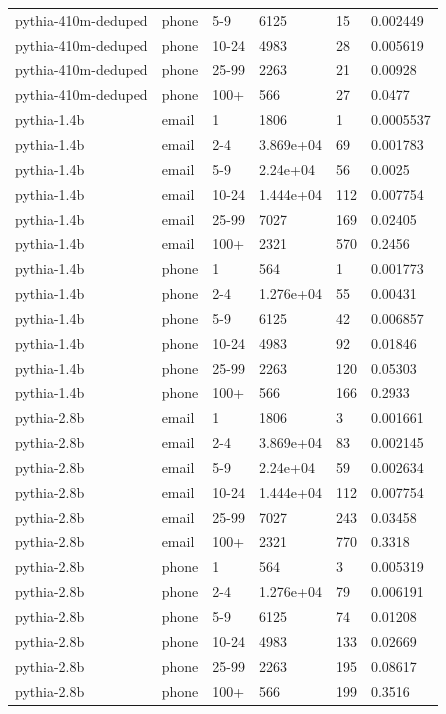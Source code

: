 \begin{tabular}{llllll}
pythia-410m-deduped & phone & 5-9 & 6125 & 15 & 0.002449 \\
pythia-410m-deduped & phone & 10-24 & 4983 & 28 & 0.005619 \\
pythia-410m-deduped & phone & 25-99 & 2263 & 21 & 0.00928 \\
pythia-410m-deduped & phone & 100+ & 566 & 27 & 0.0477 \\
pythia-1.4b & email & 1 & 1806 & 1 & 0.0005537 \\
pythia-1.4b & email & 2-4 & 3.869e+04 & 69 & 0.001783 \\
pythia-1.4b & email & 5-9 & 2.24e+04 & 56 & 0.0025 \\
pythia-1.4b & email & 10-24 & 1.444e+04 & 112 & 0.007754 \\
pythia-1.4b & email & 25-99 & 7027 & 169 & 0.02405 \\
pythia-1.4b & email & 100+ & 2321 & 570 & 0.2456 \\
pythia-1.4b & phone & 1 & 564 & 1 & 0.001773 \\
pythia-1.4b & phone & 2-4 & 1.276e+04 & 55 & 0.00431 \\
pythia-1.4b & phone & 5-9 & 6125 & 42 & 0.006857 \\
pythia-1.4b & phone & 10-24 & 4983 & 92 & 0.01846 \\
pythia-1.4b & phone & 25-99 & 2263 & 120 & 0.05303 \\
pythia-1.4b & phone & 100+ & 566 & 166 & 0.2933 \\
pythia-2.8b & email & 1 & 1806 & 3 & 0.001661 \\
pythia-2.8b & email & 2-4 & 3.869e+04 & 83 & 0.002145 \\
pythia-2.8b & email & 5-9 & 2.24e+04 & 59 & 0.002634 \\
pythia-2.8b & email & 10-24 & 1.444e+04 & 112 & 0.007754 \\
pythia-2.8b & email & 25-99 & 7027 & 243 & 0.03458 \\
pythia-2.8b & email & 100+ & 2321 & 770 & 0.3318 \\
pythia-2.8b & phone & 1 & 564 & 3 & 0.005319 \\
pythia-2.8b & phone & 2-4 & 1.276e+04 & 79 & 0.006191 \\
pythia-2.8b & phone & 5-9 & 6125 & 74 & 0.01208 \\
pythia-2.8b & phone & 10-24 & 4983 & 133 & 0.02669 \\
pythia-2.8b & phone & 25-99 & 2263 & 195 & 0.08617 \\
pythia-2.8b & phone & 100+ & 566 & 199 & 0.3516 \\

\end{tabular}
